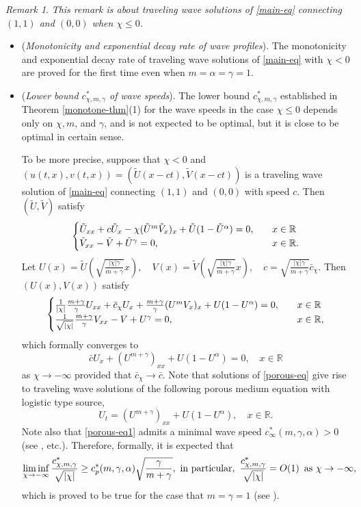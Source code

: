 \documentclass[11pt]{article} %
\theoremstyle{remark}
\newtheorem{remark}{Remark}[section]
\theoremstyle{remark}
\numberwithin{equation}{section}
\numberwithin{figure}{section}
\numberwithin{table}{section}
\newcommand\RR{\ensuremath{\mathbb{R}}}
\begin{document}
\begin{remark}
\label{rk2} 
{\it This remark is about traveling wave solutions of \eqref{main-eq} connecting $(1,1)$ and $(0,0)$ when $\chi\le 0$. }

\begin{itemize}



\item[(1)] ({\it Monotonicity and exponential decay rate of wave profiles}).
The monotonicity and exponential decay rate of traveling wave solutions of \eqref{main-eq} with $\chi<0$ are  proved for the first time even when $m=\alpha=\gamma=1$. 

\item[(2)] ({\it  Lower bound  $c^*_{\chi,m,\gamma}$ of wave speeds}). 
The lower bound $c^*_{\chi,m,\gamma}$ established in Theorem \ref{monotone-thm}(1) for the  wave speeds in the case $\chi\le 0$  depends only on $\chi,m$, and $\gamma$, and is
not  expected to be optimal, but it is close to be optimal in certain sense. 
 
To be more precise, 
suppose that $\chi<0$ and $(u(t,x),v(t,x))=(\tilde U(x-ct),\tilde V(x-ct))$ is a traveling wave solution of \eqref{main-eq}
connecting $(1,1)$ and $(0,0)$ with speed $c$.  Then $(\tilde U,\tilde V)$ satisfy
$$
\begin{cases}
\tilde U_{xx}+c\tilde U_x-\chi (\tilde U^m \tilde V_x)_x+\tilde U(1-\tilde U^\alpha)=0,\quad &x\in\RR\cr
\tilde V_{xx}-\tilde V+\tilde U^\gamma=0,\quad &x\in\RR.
\end{cases}
$$
Let $U(x)=\tilde U(\sqrt{\frac{|\chi|\gamma}{m+\gamma}} x),\quad V(x)=\tilde V(\sqrt{\frac{|\chi|\gamma}{m+\gamma}} x),\quad c=\sqrt{\frac{|\chi|\gamma}{m+\gamma}}\bar c_\chi.
$
Then $(U(x),V(x))$ satisfy
$$
\begin{cases}
\frac{1}{|\chi|} \frac{m+\gamma}{\gamma} U_{xx}+ \bar c_\chi  U_x +\frac{m+\gamma}{\gamma} (U^mV_x)_x+U(1-U^\alpha)=0,\quad &x\in\RR\cr
\frac{1}{\sqrt{|\chi|}}\frac{m+\gamma}{\gamma}V_{xx}-V+U^\gamma=0,\quad &x\in\RR,
\end{cases}
$$
which formally converges to
\begin{equation}
\label{porous-eq}
\bar c  U_x+ (U^{m+\gamma})_{xx}+U(1-U^\alpha)=0,\quad x\in\RR
\end{equation}
as $\chi\to  -\infty$ provided that $\bar c_{\chi}\to \bar c$. Note that solutions of  \eqref{porous-eq} give rise to traveling wave solutions of the following  porous medium equation with logistic type source,
\begin{equation}
\label{porous-eq1}
U_t= (U^{m+\gamma})_{xx}+U(1-U^\alpha),\quad x\in\RR.
\end{equation}
 Note also that \eqref{porous-eq1}
 admits a minimal wave speed $c_\infty^*(m,\gamma,\alpha)>0$ (see \cite{Aro1979, AtRo, Biro}, etc.). Therefore, formally, it is expected that
$$
\liminf_{\chi\to -\infty}\frac{c^*_{\chi,m,\gamma}}{\sqrt{|\chi|}}\ge c_p^*(m,\gamma,\alpha)\sqrt{\frac{\gamma}{m+\gamma}},\,\, \text{in particular},\,\, \frac{c^*_{\chi,m,\gamma}}{\sqrt{|\chi|}}=O(1)\,\,\, {\rm as}\,\, \chi\to -\infty,
$$
which is proved to be true for the case that $m=\gamma=1$ (see \cite[Theorem 2.1]{GrHeTu2023}).


\end{itemize}
\end{remark}
\end{document}
